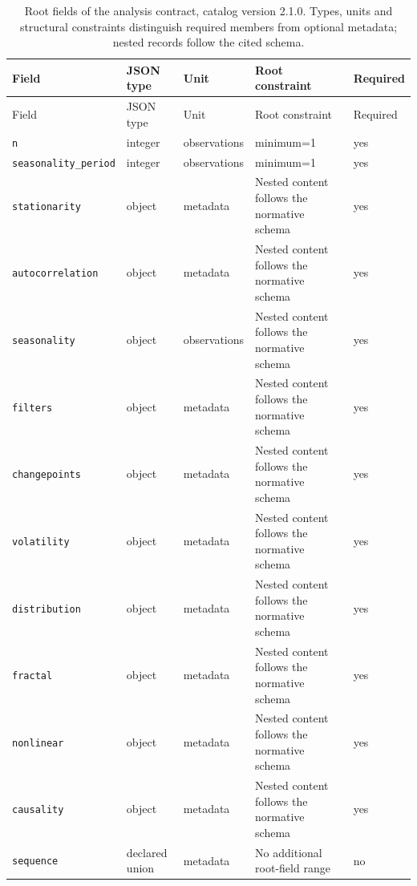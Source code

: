 \begingroup\small
\begin{longtable}{@{}p{}p{}p{}p{}p{}@{}}
\caption{Root fields of the analysis contract, catalog version 2.1.0. Types, units and structural constraints distinguish required members from optional metadata; nested records follow the cited schema.}\label{tab:contract-analysis}\\
\toprule Field & JSON type & Unit & Root constraint & Required\\\midrule\endfirsthead
\toprule Field & JSON type & Unit & Root constraint & Required\\\midrule\endhead
\texttt{n} & integer & observations & minimum=1 & yes\\
\texttt{seasonality\_\allowbreak{}period} & integer & observations & minimum=1 & yes\\
\texttt{stationarity} & object & metadata & Nested content follows the normative schema & yes\\
\texttt{autocorrelation} & object & metadata & Nested content follows the normative schema & yes\\
\texttt{seasonality} & object & observations & Nested content follows the normative schema & yes\\
\texttt{filters} & object & metadata & Nested content follows the normative schema & yes\\
\texttt{changepoints} & object & metadata & Nested content follows the normative schema & yes\\
\texttt{volatility} & object & metadata & Nested content follows the normative schema & yes\\
\texttt{distribution} & object & metadata & Nested content follows the normative schema & yes\\
\texttt{fractal} & object & metadata & Nested content follows the normative schema & yes\\
\texttt{nonlinear} & object & metadata & Nested content follows the normative schema & yes\\
\texttt{causality} & object & metadata & Nested content follows the normative schema & yes\\
\texttt{sequence} & declared union & metadata & No additional root-field range & no\\
\bottomrule
\end{longtable}
\endgroup
